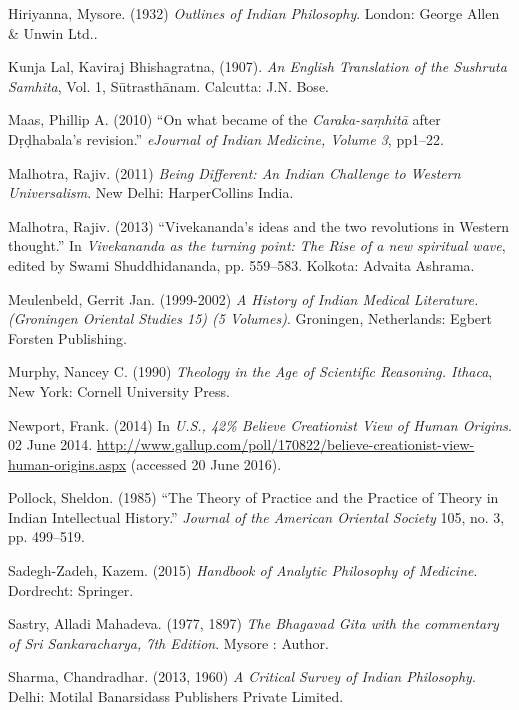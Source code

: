 \begin{thebibliography}{99}
Hiriyanna, Mysore. (1932) {\sl Outlines of Indian Philosophy}. London: George Allen \& Unwin Ltd..

Kunja Lal, Kaviraj Bhishagratna, (1907). {\sl An English Translation of the Sushruta Samhita}, Vol. 1, Sūtrasthānam. Calcutta: J.N. Bose.

Maas, Phillip A. (2010) ``On what became of the {\sl Caraka-saṃhitā} after Dṛḍhabala's revision.'' {\sl eJournal of Indian Medicine, Volume 3}, pp1--22.

Malhotra, Rajiv. (2011) {\sl Being Different: An Indian Challenge to Western Universalism}. New Delhi: HarperCollins India.

Malhotra, Rajiv. (2013) ``Vivekananda's ideas and the two revolutions in Western thought.'' In {\sl Vivekananda as the turning point: The Rise of a new spiritual wave}, edited by Swami Shuddhidananda, pp. 559--583. Kolkota: Advaita Ashrama.

Meulenbeld, Gerrit Jan. (1999-2002) {\sl A History of Indian Medical Literature. (Groningen Oriental Studies 15) (5 Volumes)}. Groningen, Netherlands: Egbert Forsten Publishing.

Murphy, Nancey C. (1990) {\sl Theology in the Age of Scientific Reasoning. Ithaca}, New York: Cornell University Press.

Newport, Frank. (2014) In {\sl U.S., 42\% Believe Creationist View of Human Origins}. 02 June 2014. \url{http://www.gallup.com/poll/170822/believe-creationist-view-human-origins.aspx} (accessed 20 June 2016).

Pollock, Sheldon. (1985) ``The Theory of Practice and the Practice of Theory in Indian Intellectual History.'' {\sl Journal of the American Oriental Society} 105, no. 3, pp. 499--519.

Sadegh-Zadeh, Kazem. (2015) {\sl Handbook of Analytic Philosophy of Medicine}. Dordrecht: Springer.

Sastry, Alladi Mahadeva. (1977, 1897) {\sl The Bhagavad Gita with the commentary of Sri Sankaracharya, 7th Edition}. Mysore : Author.

Sharma, Chandradhar. (2013, 1960) {\sl A Critical Survey of Indian Philosophy}. Delhi: Motilal Banarsidass Publishers Private Limited.


\end{thebibliography}
